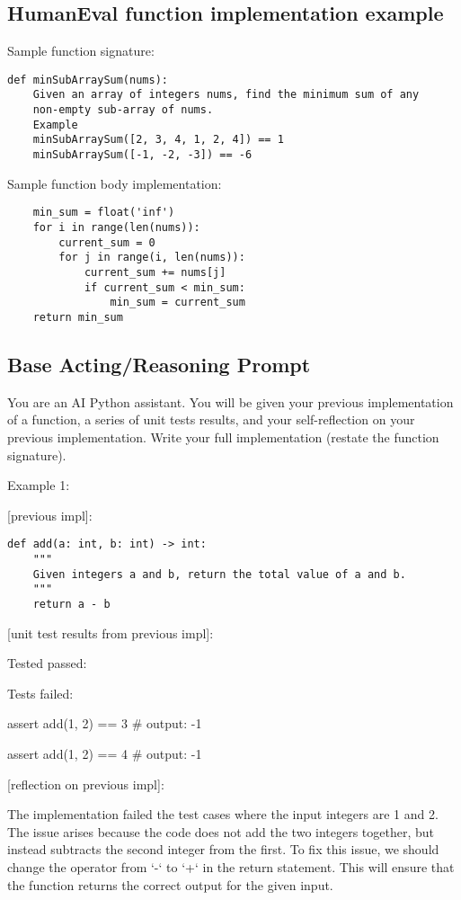 \documentclass{article} \usepackage{iclr2024_conference,times}
\begin{document}
\subsection{HumanEval function implementation example}
Sample function signature:\\
\begin{lstlisting}
def minSubArraySum(nums):
    Given an array of integers nums, find the minimum sum of any
    non-empty sub-array of nums.
    Example
    minSubArraySum([2, 3, 4, 1, 2, 4]) == 1
    minSubArraySum([-1, -2, -3]) == -6
\end{lstlisting}

Sample function body implementation:\\
\begin{lstlisting}
    min_sum = float('inf')
    for i in range(len(nums)):
        current_sum = 0
        for j in range(i, len(nums)):
            current_sum += nums[j]
            if current_sum < min_sum:
                min_sum = current_sum
    return min_sum
\end{lstlisting}

\subsection{Base Acting/Reasoning Prompt}

You are an AI Python assistant. You will be given your previous implementation of a function, a series of unit tests results, and your self-reflection on your previous implementation. Write your full implementation (restate the function signature).

Example 1:

[previous impl]:

\begin{lstlisting}
def add(a: int, b: int) -> int:
    """
    Given integers a and b, return the total value of a and b.
    """
    return a - b
\end{lstlisting}

[unit test results from previous impl]:

Tested passed:

Tests failed:

assert add(1, 2) == 3 \# output: -1

assert add(1, 2) == 4 \# output: -1

[reflection on previous impl]:

The implementation failed the test cases where the input integers are 1 and 2. The issue arises because the code does not add the two integers together, but instead subtracts the second integer from the first. To fix this issue, we should change the operator from `-` to `+` in the return statement. This will ensure that the function returns the correct output for the given input.
\end{document}
